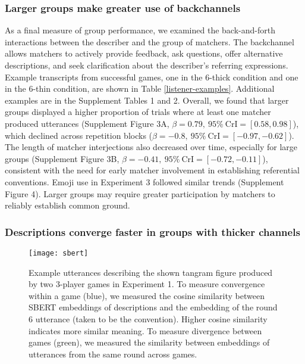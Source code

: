 \documentclass[
  english,
]{article}
\begin{document}
\subsubsection{Larger groups make greater use of backchannels}\label{larger-groups-make-greater-use-of-backchannels}

As a final measure of group performance, we examined the back-and-forth interactions between the describer and the group of matchers.
The backchannel allows matchers to actively provide feedback, ask questions, offer alternative descriptions, and seek clarification about the describer's referring expressions.
Example transcripts from successful games, one in the 6-thick condition and one in the 6-thin condition, are shown in Table \ref{listener-examples}. Additional examples are in the Supplement Tables 1 and 2.
Overall, we found that larger groups displayed a higher proportion of trials where at least one matcher produced utterances (Supplement Figure 3A, \(\beta=0.79,\:95\%\:\mathrm{CrI}=[0.58, 0.98]\)), which declined across repetition blocks (\(\beta=-0.8,\:95\%\:\mathrm{CrI}=[-0.97, -0.62]\)).
The length of matcher interjections also decreased over time, especially for large groups (Supplement Figure 3B, \(\beta=-0.41,\:95\%\:\mathrm{CrI}=[-0.72, -0.11]\)), consistent with the need for early matcher involvement in establishing referential conventions.
Emoji use in Experiment 3 followed similar trends (Supplement Figure 4).
Larger groups may require greater participation by matchers to reliably establish common ground.

\subsubsection{Descriptions converge faster in groups with thicker channels}\label{descriptions-converge-faster-in-groups-with-thicker-channels}

\begin{figure*}[t!]

{\centering \texttt{[image: sbert]} 

}

\caption{Example utterances describing the shown tangram figure produced by two 3-player games in Experiment 1. To measure convergence within a game (blue), we measured the cosine similarity between SBERT embeddings of descriptions and the embedding of the round 6 utterance (taken to be the convention). Higher cosine similarity indicates more similar meaning. To measure divergence between games (green), we measured the similarity between embeddings of utterances from the same round across games.}\label{fig:sbert-diagram}
\end{figure*}
\end{document}
